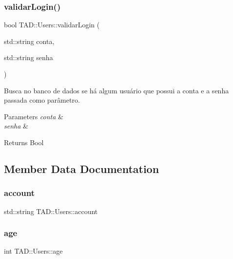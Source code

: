 \subsubsection{\texorpdfstring{validar\+Login()}{validarLogin()}}
{\footnotesize\ttfamily bool T\+A\+D\+::\+Users\+::validar\+Login (\begin{DoxyParamCaption}\item[{std\+::string}]{conta,  }\item[{std\+::string}]{senha }\end{DoxyParamCaption})}



Busca no banco de dados se há algum usuário que possui a conta e a senha passada como parâmetro. 


\begin{DoxyParams}{Parameters}
{\em conta} & \\
\hline
{\em senha} & \\
\hline
\end{DoxyParams}
\begin{DoxyReturn}{Returns}
Bool 
\end{DoxyReturn}


\subsection{Member Data Documentation}
\mbox{\label{class_t_a_d_1_1_users_a013ff5d23b0a55d1ff6592c249a541d1}} 
\subsubsection{\texorpdfstring{account}{account}}
{\footnotesize\ttfamily std\+::string T\+A\+D\+::\+Users\+::account\hspace{0.3cm}{\ttfamily [private]}}

\mbox{\label{class_t_a_d_1_1_users_a0801b7b5b5bb7125b839bec33b86b72f}} 
\subsubsection{\texorpdfstring{age}{age}}
{\footnotesize\ttfamily int T\+A\+D\+::\+Users\+::age\hspace{0.3cm}{\ttfamily [private]}}

